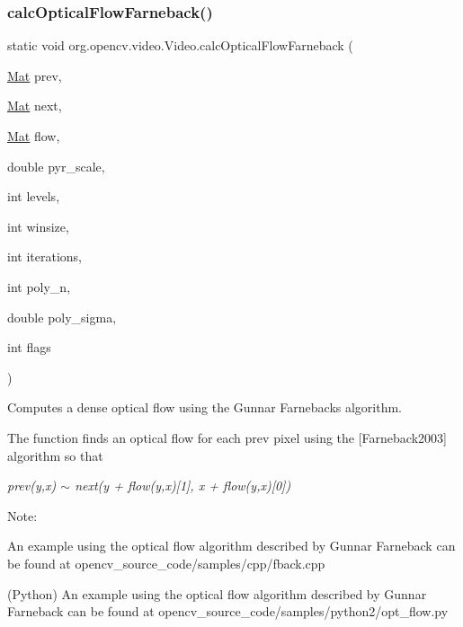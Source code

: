 \subsubsection{\texorpdfstring{calc\+Optical\+Flow\+Farneback()}{calcOpticalFlowFarneback()}}
{\footnotesize\ttfamily static void org.\+opencv.\+video.\+Video.\+calc\+Optical\+Flow\+Farneback (\begin{DoxyParamCaption}\item[{\mbox{\hyperlink{classorg_1_1opencv_1_1core_1_1_mat}{Mat}}}]{prev,  }\item[{\mbox{\hyperlink{classorg_1_1opencv_1_1core_1_1_mat}{Mat}}}]{next,  }\item[{\mbox{\hyperlink{classorg_1_1opencv_1_1core_1_1_mat}{Mat}}}]{flow,  }\item[{double}]{pyr\+\_\+scale,  }\item[{int}]{levels,  }\item[{int}]{winsize,  }\item[{int}]{iterations,  }\item[{int}]{poly\+\_\+n,  }\item[{double}]{poly\+\_\+sigma,  }\item[{int}]{flags }\end{DoxyParamCaption})\hspace{0.3cm}{\ttfamily [static]}}

Computes a dense optical flow using the Gunnar Farneback\textquotesingle{}s algorithm.

The function finds an optical flow for each {\ttfamily prev} pixel using the \mbox{[}Farneback2003\mbox{]} algorithm so that

{\itshape prev(y,x) $\sim$ next(y + flow(y,x)\mbox{[}1\mbox{]}, x + flow(y,x)\mbox{[}0\mbox{]})}

Note\+:


\begin{DoxyItemize}
\item An example using the optical flow algorithm described by Gunnar Farneback can be found at opencv\+\_\+source\+\_\+code/samples/cpp/fback.\+cpp 
\item (Python) An example using the optical flow algorithm described by Gunnar Farneback can be found at opencv\+\_\+source\+\_\+code/samples/python2/opt\+\_\+flow.\+py 
\end{DoxyItemize}


